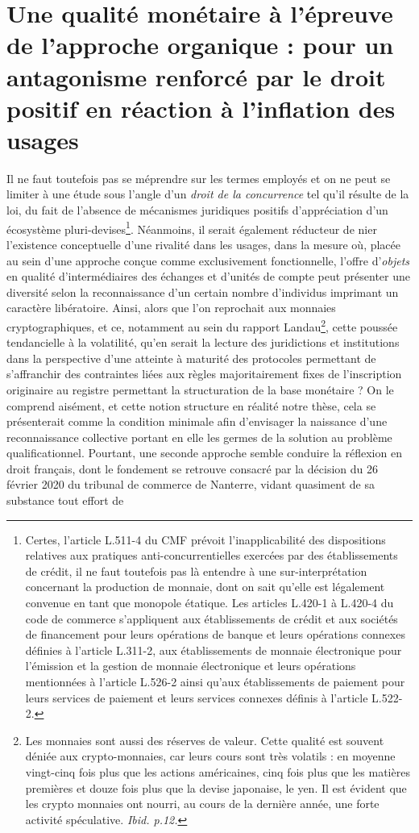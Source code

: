 {\section{Une qualité monétaire à l'épreuve de l'approche organique : pour un antagonisme renforcé par le droit positif en réaction à l'inflation des usages}

Il ne faut toutefois pas se méprendre sur les termes employés et on ne peut se limiter à une étude sous l'angle d'un \emph{droit de la concurrence} tel qu'il résulte de la loi, du fait de l'absence de mécanismes juridiques positifs d'appréciation d'un écosystème pluri-devises\footnote{Certes, l'article L.511-4 du CMF prévoit l'inapplicabilité des dispositions relatives aux pratiques anti-concurrentielles exercées par des établissements de crédit, il ne faut toutefois pas là entendre à une sur-interprétation concernant la production de monnaie, dont on sait qu'elle est légalement convenue en tant que monopole étatique. \og Les articles L.420-1 à L.420-4 du code de commerce s'appliquent aux établissements de crédit et aux sociétés de financement pour leurs opérations de banque et leurs opérations connexes définies à l'article L.311-2, aux établissements de monnaie électronique pour l'émission et la gestion de monnaie électronique et leurs opérations mentionnées à l'article L.526-2 ainsi qu'aux établissements de paiement pour leurs services de paiement et leurs services connexes définis à l'article L.522-2\fg{}.}. Néanmoins, il serait également réducteur de nier l'existence conceptuelle d'une rivalité dans les usages, dans la mesure où, placée au sein d'une approche conçue comme exclusivement fonctionnelle, l'offre d'\emph{objets} en qualité d'intermédiaires des échanges et d'unités de compte peut présenter une diversité selon la reconnaissance d'un certain nombre d'individus imprimant un caractère libératoire. Ainsi, alors que l'on reprochait aux monnaies cryptographiques, et ce, notamment au sein du rapport Landau\footnote{\og Les monnaies sont aussi des réserves de valeur. Cette qualité est souvent déniée aux crypto-monnaies, car leurs cours sont très volatils : en moyenne vingt-cinq fois plus que les actions américaines, cinq fois plus que les matières premières et douze fois plus que la devise japonaise, le yen. Il est évident que les crypto monnaies ont nourri, au cours de la dernière année, une forte activité spéculative\fg{}. \emph{Ibid. p.12.}}, cette poussée tendancielle à la volatilité, qu'en serait la lecture des juridictions et institutions dans la perspective d'une atteinte à maturité des protocoles permettant de s'affranchir des contraintes liées aux règles majoritairement fixes de l'inscription originaire au registre permettant la structuration de la base monétaire ? On le comprend aisément, et cette notion structure en réalité notre thèse, cela se présenterait comme la condition minimale afin d'envisager la naissance d'une reconnaissance collective portant en elle les germes de la solution au problème qualificationnel. Pourtant, une seconde approche semble conduire la réflexion en droit français, dont le fondement se retrouve consacré par la décision du 26 février 2020 du tribunal de commerce de Nanterre, vidant quasiment de sa substance tout effort de }
